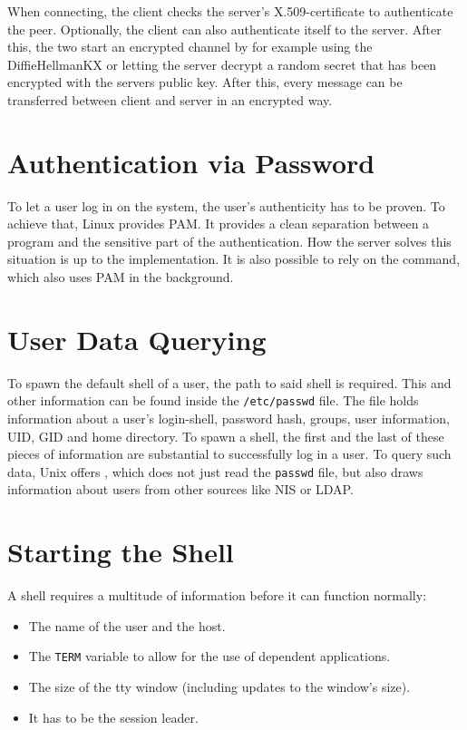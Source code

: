 \documentclass[10pt,a4paper,titlepage,twoside,english,final]{zhawreprt}
\begin{document}
When connecting, the client checks the server's \gls{X.509}-certificate to authenticate the peer.
Optionally, the client can also authenticate itself to the server.
After this, the two start an encrypted channel by for example using the \gls{DiffieHellmanKX} or letting the server decrypt a random secret that has been encrypted with the servers public key.
After this, every message can be transferred between client and server in an encrypted way.

\section{Authentication via Password}\label{sec:DesignAuthViaPw}
To let a user log in on the system, the user's authenticity has to be proven.
To achieve that, \gls{Linux} provides \gls{PAM}.
It provides a clean separation between a program and the sensitive part of the authentication.
How the server solves this situation is up to the implementation.
It is also possible to rely on the \cite{login} command, which also uses \gls{PAM} in the background.

\section{User Data Querying}\label{sec:DesignUserDataQuerying}
To spawn the default \gls{shell} of a user, the path to said \gls{shell} is required.
This and other information can be found inside the \texttt{/etc/passwd} file.
The file holds information about a user's \gls{login}-\gls{shell}, password hash, groups, user information, \gls{UID}, \gls{GID} and home directory.
To spawn a \gls{shell}, the first and the last of these pieces of information are substantial to successfully log in a user.
To query such data, \gls{Unix} offers \cite{getpw}, which does not just read the \texttt{passwd} file, but also draws information about users from other sources like \gls{NIS} or \gls{LDAP}.


\section{Starting the Shell}\label{sec:DesignStartingTheShell}
A \gls{shell} requires a multitude of information before it can function normally:
\begin{itemize}
\item The name of the user and the host.
\item The \texttt{TERM} variable to allow for the use of \cite{ncurses} dependent applications.
\item The size of the \gls{tty} window (including updates to the window's size).
\item It has to be the session leader.
\end{itemize}
\end{document}
